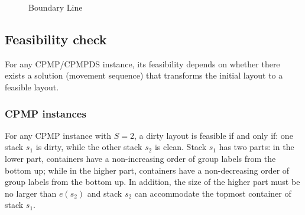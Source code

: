 \documentclass[review,3p,times,authoryear,12pt]{elsarticle}
\begin{document}
\begin{figure}[htbp]
\centering
{}
\caption{Boundary Line}
\label{fig4}
\end{figure}


\subsection{Feasibility check}

For any CPMP/CPMPDS instance, its feasibility depends on whether there exists a solution (movement sequence) that transforms the initial layout to a feasible layout.

\subsubsection{CPMP instances}

For any CPMP instance with $S=2$, a dirty layout is feasible if and only if: one stack $s_1$ is dirty, while the other stack $s_2$ is clean.
Stack $s_1$ has two parts: in the lower part, containers have a non-increasing order of group labels from the bottom up; while in the higher part, containers have a non-decreasing order of group labels from the bottom up.
In addition, the size of the higher part must be no larger than $e(s_2)$ and stack $s_2$ can accommodate the topmost container of stack $s_1$.
\end{document}
